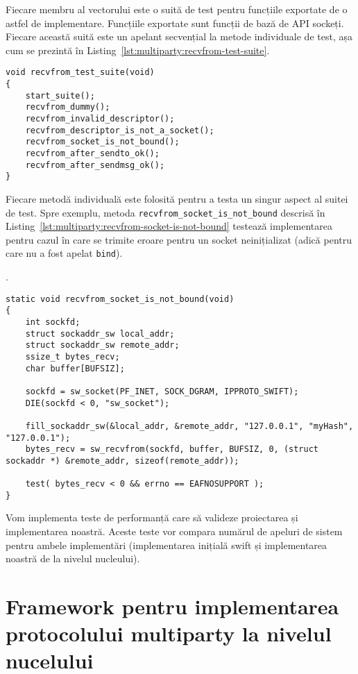 Fiecare membru al vectorului este o suită de test pentru funcțiile exportate
de o astfel de implementare. Funcțiile exportate sunt funcții de bază de API
sockeți. Fiecare această suită este un apelant secvențial la metode
individuale de test, așa cum se prezintă în
Listing~\ref{lst:multiparty:recvfrom-test-suite}.

\lstset{language=C,caption=Test Suite for recvfrom Call,label=lst:multiparty:recvfrom-test-suite}
\begin{lstlisting}
void recvfrom_test_suite(void)
{
    start_suite();
    recvfrom_dummy();
    recvfrom_invalid_descriptor();
    recvfrom_descriptor_is_not_a_socket();
    recvfrom_socket_is_not_bound();
    recvfrom_after_sendto_ok();
    recvfrom_after_sendmsg_ok();
}
\end{lstlisting}

Fiecare metodă individuală este folosită pentru a testa un singur aspect al
suitei de test. Spre exemplu, metoda \texttt{recvfrom\_socket\_is\_not\_bound}
descrisă în Listing~\ref{lst:multiparty:recvfrom-socket-is-not-bound} testează
implementarea pentru cazul în care se trimite eroare pentru un socket
neinițializat (adică pentru care nu a fost apelat \texttt{bind}).

\lstset{language=C,caption=Basic Method for Testing recvfrom
Call,label=lst:multiparty:recvfrom-socket-is-not-bound}.
\begin{lstlisting}
static void recvfrom_socket_is_not_bound(void)
{
    int sockfd;
    struct sockaddr_sw local_addr;
    struct sockaddr_sw remote_addr;
    ssize_t bytes_recv;
    char buffer[BUFSIZ];

    sockfd = sw_socket(PF_INET, SOCK_DGRAM, IPPROTO_SWIFT);
    DIE(sockfd < 0, "sw_socket");

    fill_sockaddr_sw(&local_addr, &remote_addr, "127.0.0.1", "myHash", "127.0.0.1");
    bytes_recv = sw_recvfrom(sockfd, buffer, BUFSIZ, 0, (struct sockaddr *) &remote_addr, sizeof(remote_addr));

    test( bytes_recv < 0 && errno == EAFNOSUPPORT );
}
\end{lstlisting}

Vom implementa teste de performanță care să valideze proiectarea și
implementarea noastră. Aceste teste vor compara numărul de apeluri de sistem
pentru ambele implementări (implementarea inițială swift și implementarea
noastră de la nivelul nucleului).

\section{Framework pentru implementarea protocolului multiparty la nivelul
nucelului}
\label{sec:multiparty:kernel-framework}

